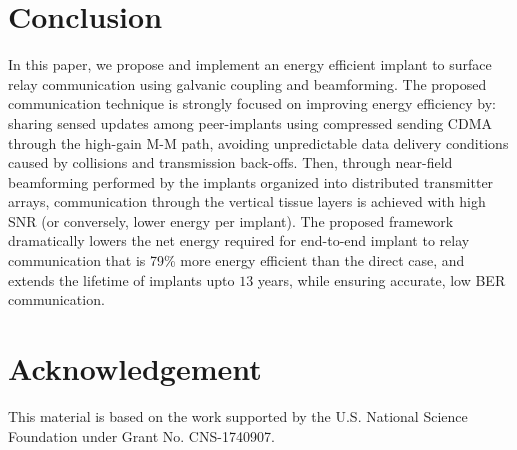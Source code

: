 \section{Conclusion}\label{sec:concl}
In this paper, we propose and implement an energy efficient implant to surface relay communication using galvanic coupling and beamforming. The proposed communication technique is strongly focused on improving energy efficiency by: sharing sensed updates among peer-implants using compressed sending CDMA through the high-gain M-M path, avoiding unpredictable data delivery conditions caused by collisions and transmission back-offs. Then, through near-field beamforming performed by the implants organized into distributed transmitter arrays, communication through the vertical tissue layers is achieved with high SNR (or conversely, lower energy per implant). The proposed framework dramatically lowers the net energy required for end-to-end implant to relay communication that is 79\% more energy efficient than the direct case, and extends the lifetime of implants upto $13$ years, while ensuring accurate, low BER communication.
\section*{Acknowledgement}
This material is based on the work supported by the U.S.
National Science Foundation under Grant No. CNS-1740907.




